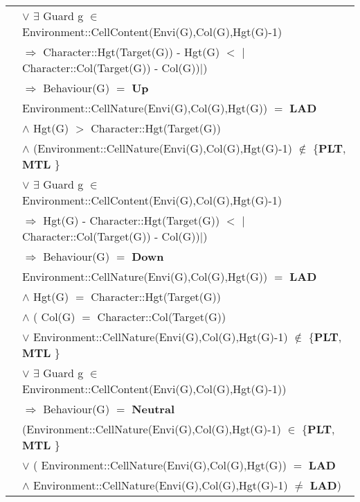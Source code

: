 \documentclass[8pt]{article}
\begin{document}
{\begin{longtable}{rl}
  & \quad\quad\quad\quad $\lor$ $\exists$ \textrm{Guard} g $\in$ \textrm{Environment::CellContent(Envi(G),Col(G),Hgt(G)-1)} \\
  & \quad\quad\quad\quad $\Rightarrow$ \textrm{Character::Hgt(Target(G)) - Hgt(G)} $<$ $|$\textrm{Character::Col(Target(G)) - Col(G)})$|$)\\
  & \quad\quad $\Rightarrow$ \textrm{Behaviour(G)} $=$ \textbf{Up} \\
  & \textrm{Environment::CellNature(Envi(G),Col(G),Hgt(G))} $=$ \textbf{LAD} \\
  & \quad\quad $\land$ \textrm{Hgt(G)} $>$ \textrm{Character::Hgt(Target(G))} \\
  & \quad\quad $\land$ (\textrm{Environment::CellNature(Envi(G),Col(G),Hgt(G)-1)} $\notin$ \{\textbf{PLT}, \textbf{MTL}  \} \\
  & \quad\quad\quad\quad $\lor$ $\exists$ \textrm{Guard} g $\in$ \textrm{Environment::CellContent(Envi(G),Col(G),Hgt(G)-1)} \\
  & \quad\quad\quad\quad $\Rightarrow$ \textrm{Hgt(G) - Character::Hgt(Target(G))} $<$ $|$\textrm{Character::Col(Target(G)) - Col(G)})$|$)\\
  & \quad\quad $\Rightarrow$ \textrm{Behaviour(G)} $=$ \textbf{Down} \\
  & \textrm{Environment::CellNature(Envi(G),Col(G),Hgt(G))} $=$ \textbf{LAD} \\
  & \quad\quad $\land$ \textrm{Hgt(G)} $=$ \textrm{Character::Hgt(Target(G))} \\
  & \quad\quad $\land$ ( \textrm{Col(G)} $=$ \textrm{Character::Col(Target(G))}\\
  & \quad\quad\quad\quad $\lor$ \textrm{Environment::CellNature(Envi(G),Col(G),Hgt(G)-1)} $\notin$ \{\textbf{PLT}, \textbf{MTL}  \} \\
  & \quad\quad\quad\quad $\lor$ $\exists$ \textrm{Guard} g $\in$ \textrm{Environment::CellContent(Envi(G),Col(G),Hgt(G)-1)}) \\
  & \quad\quad $\Rightarrow$ \textrm{Behaviour(G)} $=$ \textbf{Neutral} \\
  & (\textrm{Environment::CellNature(Envi(G),Col(G),Hgt(G)-1)} $\in$ \{\textbf{PLT}, \textbf{MTL}  \} \\
  & \quad\quad\quad\quad $\lor$ ( \textrm{Environment::CellNature(Envi(G),Col(G),Hgt(G))} $=$ \textbf{LAD} \\
  & \quad\quad\quad\quad\quad\quad $\land$ \textrm{Environment::CellNature(Envi(G),Col(G),Hgt(G)-1)} $\neq$ \textbf{LAD}) \\

\end{longtable}}
\end{document}
